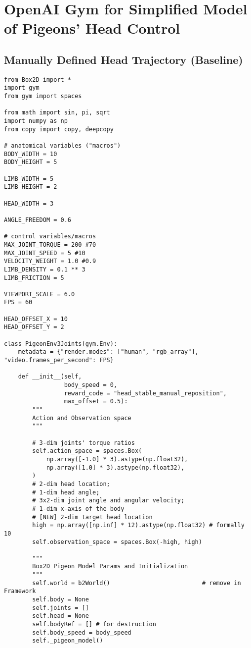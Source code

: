 \section{OpenAI Gym for Simplified Model of Pigeons' Head Control}
\subsection{Manually Defined Head Trajectory (Baseline)}
\begin{lstlisting}
from Box2D import *
import gym
from gym import spaces

from math import sin, pi, sqrt
import numpy as np
from copy import copy, deepcopy

# anatomical variables ("macros")
BODY_WIDTH = 10
BODY_HEIGHT = 5

LIMB_WIDTH = 5
LIMB_HEIGHT = 2

HEAD_WIDTH = 3

ANGLE_FREEDOM = 0.6

# control variables/macros
MAX_JOINT_TORQUE = 200 #70
MAX_JOINT_SPEED = 5 #10
VELOCITY_WEIGHT = 1.0 #0.9
LIMB_DENSITY = 0.1 ** 3
LIMB_FRICTION = 5

VIEWPORT_SCALE = 6.0
FPS = 60

HEAD_OFFSET_X = 10
HEAD_OFFSET_Y = 2

class PigeonEnv3Joints(gym.Env):
    metadata = {"render.modes": ["human", "rgb_array"], "video.frames_per_second": FPS}

    def __init__(self,
                 body_speed = 0,
                 reward_code = "head_stable_manual_reposition",
                 max_offset = 0.5):
        """
        Action and Observation space
        """

        # 3-dim joints' torque ratios
        self.action_space = spaces.Box(
            np.array([-1.0] * 3).astype(np.float32),
            np.array([1.0] * 3).astype(np.float32),
        )
        # 2-dim head location;
        # 1-dim head angle;
        # 3x2-dim joint angle and angular velocity;
        # 1-dim x-axis of the body
        # [NEW] 2-dim target head location
        high = np.array([np.inf] * 12).astype(np.float32) # formally 10
        self.observation_space = spaces.Box(-high, high)

        """
        Box2D Pigeon Model Params and Initialization
        """
        self.world = b2World()                          # remove in Framework
        self.body = None
        self.joints = []
        self.head = None
        self.bodyRef = [] # for destruction
        self.body_speed = body_speed
        self._pigeon_model()


\end{lstlisting}
